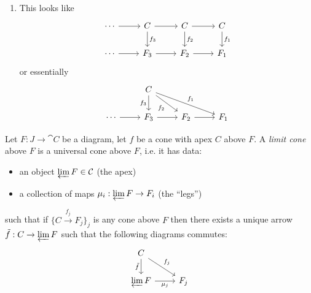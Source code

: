 \documentclass[12pt]{article}
\begin{document}
\begin{example}
\begin{enumerate}
	\item This looks like 
		\begin{equation*}
\begin{tikzcd}
\cdots \arrow[r] & C \arrow[d, "f_3"] \arrow[r] & C \arrow[d, "f_2"] \arrow[r] & C \arrow[d, "f_1"] \\
\cdots \arrow[r] & F_3 \arrow[r]                & F_2 \arrow[r]                & F_1               
\end{tikzcd}
		\end{equation*}
		or essentially 
		\begin{equation*}
\begin{tikzcd}
                 & C \arrow[rd, "f_2"'] \arrow[d, "f_3"'] \arrow[rrd, "f_1"] &               &     \\
\cdots \arrow[r] & F_3 \arrow[r]                                             & F_2 \arrow[r] & F_1
\end{tikzcd}
		\end{equation*}
	\end{enumerate}
\end{example}

\begin{definition}
	Let $F:J\to \cat{C}$ be a diagram, let $f$ be a cone with apex $C$ above $F$. A \emph{limit cone} above $F$ is a universal cone above $F$, i.e. it has data:
	\begin{itemize}
		\item an object $\varprojlim F\in\mathcal{C}$ (the apex)
		\item a collection of maps $\mu_i:\varprojlim F\to F_i$ (the ``legs'')
	\end{itemize}
	such that if $\{C\overset{f_j}{\to} F_j\}_j$ is any cone above $F$ then there exists a unique arrow $\tilde{f}:C\to\varprojlim F$ such that the following diagrams commutes:
	\begin{equation*}
\begin{tikzcd}
C \arrow[rd, "f_j"] \arrow[d, "\tilde{f}"'] &     \\
\varprojlim F \arrow[r, "\mu_j"']           & F_j
\end{tikzcd}
	\end{equation*}
\end{definition}
\end{document}
